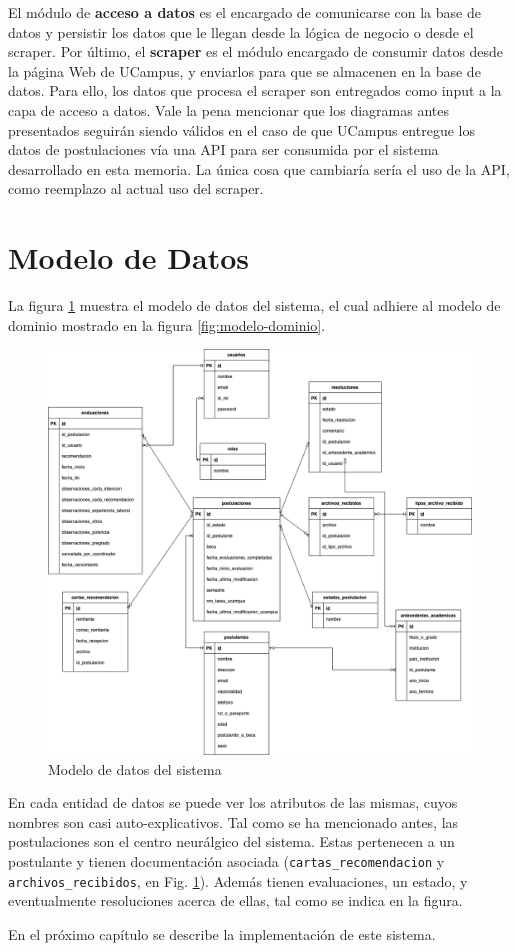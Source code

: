 El módulo de \textbf{acceso a datos} es el encargado de comunicarse con la base
de datos y persistir los datos que le llegan desde la lógica de negocio o desde
el scraper. Por último, el \textbf{scraper} es el módulo encargado de consumir
datos desde la página Web de UCampus, y enviarlos para que se almacenen en la
base de datos. Para ello, los datos que procesa el scraper son entregados como
input a la capa de acceso a datos. Vale la pena mencionar que los diagramas
antes presentados seguirán siendo válidos en el caso de que UCampus entregue los
datos de postulaciones vía una API para ser consumida por el sistema
desarrollado en esta memoria. La única cosa que cambiaría sería el uso de la
API, como reemplazo al actual uso del scraper.

\section{Modelo de Datos}

La figura \ref{fig:modelo-datos} muestra el modelo de datos del sistema, el cual
adhiere al modelo de dominio mostrado en la figura \ref{fig:modelo-dominio}.

\begin{figure}[!ht]
    \begin{center}
        \includegraphics[scale=0.4]{imagenes/03-modelo-datos.png}
    \end{center}
    \caption{Modelo de datos del sistema}
    \label{fig:modelo-datos}
\end{figure}

En cada entidad de datos se puede ver los atributos de las mismas, cuyos nombres
son casi auto-explicativos. Tal como se ha mencionado antes, las postulaciones
son el centro neurálgico del sistema. Estas pertenecen a un postulante y tienen
documentación asociada (\texttt{cartas\_recomendacion} y
\texttt{archivos\_recibidos}, en Fig. \ref{fig:modelo-datos}). Además tienen
evaluaciones, un estado, y eventualmente resoluciones acerca de ellas, tal como
se indica en la figura. 

En el próximo capítulo se describe la implementación de este sistema.
